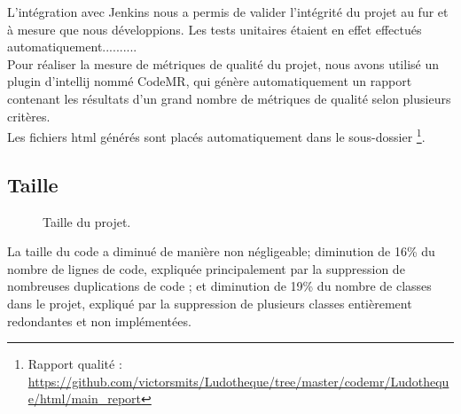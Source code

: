 \label{section:quality}
L'intégration avec Jenkins nous a permis de valider l'intégrité du projet au fur et à mesure que nous développions. Les tests unitaires étaient en effet effectués automatiquement.......... \\
Pour réaliser la mesure de métriques de qualité du projet, nous avons utilisé un plugin d'intellij nommé CodeMR, qui génère automatiquement un rapport contenant les résultats d'un grand nombre de métriques de qualité selon plusieurs critères. 
\\ Les fichiers html générés sont placés automatiquement dans le sous-dossier 
\footnote{Rapport qualité : \url{https://github.com/victorsmits/Ludotheque/tree/master/codemr/Ludotheque/html/main_report}}.

\subsection{Taille}
    \begin{figure}[h!]
        \centering
        \qquad
        \caption{Taille du projet.}
    \end{figure}
La taille du code a diminué de manière non négligeable; diminution de 16\% du nombre de lignes de code, expliquée principalement par la suppression de nombreuses duplications de code ; et diminution de 19\% du nombre de classes dans le projet, expliqué par la suppression de plusieurs classes entièrement redondantes et non implémentées. 

